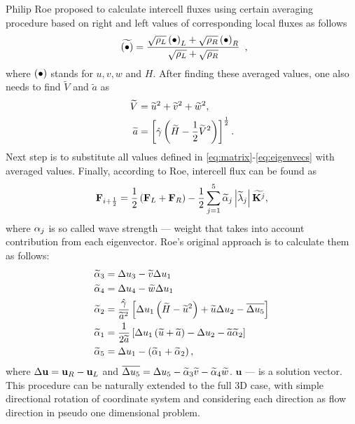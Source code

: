 Philip Roe proposed to calculate intercell fluxes using certain averaging procedure based on right and left values of corresponding local fluxes \cite{lib:Roe} as follows
\begin{align}
\begin{array}{c}
\widetilde {\left(\bullet\right)} = \displaystyle \frac {\sqrt {\rho_L} \left(\bullet\right)_L + \sqrt {\rho_R} \left(\bullet\right)_R}{\sqrt{\rho_L} + \sqrt{\rho_R}}
\end{array},
\end{align}
where $\left(\bullet\right)$ stands for $u, v, w$ and $H$. After finding these averaged values, one also needs to find $\widetilde V$ and $\widetilde a$ as 
\begin{align*}
\widetilde V &= \widetilde u^2 + \widetilde v^2 + \widetilde w^2, \\
\widetilde a &= \left[\hat {\gamma} \left(\widetilde H - \frac 12 \widetilde V^2\right)\right]^{\frac 12}.
\end{align*}
Next step is to substitute all values defined in \eqref{eq:matrix}-\eqref{eq:eigenvecs} with averaged values. Finally, according to Roe, intercell flux can be found as
\begin{align}
\mathbf F_{i+\frac 12} = \frac 12 \left(\mathbf F_L + \mathbf F_R\right) - \frac 12 \sum_{j = 1}^5 	\widetilde {\alpha}_j \left|\widetilde {\lambda}_j\right| \widetilde {\mathbf K^j},
\end{align}
where $\alpha_j$ is so called wave strength --- weight that takes into account contribution from each eigenvector. Roe's original approach is to calculate them as follows:
\begin{align}
\widetilde {\alpha}_3 &= \Delta u_3 - \widetilde v \Delta u_1 \\
\widetilde {\alpha}_4 &= \Delta u_4 - \widetilde w \Delta u_1 \\
\widetilde {\alpha}_2 &= \frac {\hat {\gamma}}{\widetilde a^2} \left[\Delta u_1 \left(\widetilde H - \widetilde u^2\right) + \widetilde u \Delta u_2 - \overline{\Delta u_5}\right] \\
\widetilde {\alpha}_1 &= \frac 1{2 \widetilde a} \left[\Delta u_1 \left(\widetilde u + \widetilde a\right) - \Delta u_2 - \widetilde a \widetilde {\alpha}_2\right] \\
\widetilde {\alpha}_5 &= \Delta u_1 - \left(\widetilde {\alpha}_1 + \widetilde {\alpha}_2\right),
\end{align}
where $\Delta \mathbf u = \mathbf u_R - \mathbf u_L$ and $\overline{\Delta u_5} = \Delta u_5 - \widetilde {\alpha}_3 \widetilde v - \widetilde {\alpha}_4 \widetilde w$. $\mathbf u$ --- is a solution vector. This procedure can be naturally extended to the full 3D case, with simple directional rotation of coordinate system and considering each direction as flow direction in pseudo one dimensional problem.





